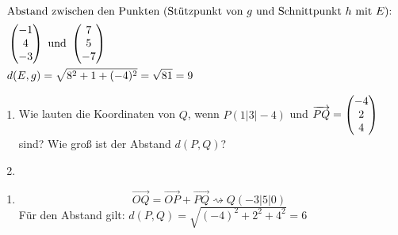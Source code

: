 \begin{lsg}{}
\begin{enumerate}
\begin{align*}
			\intertext{Abstand zwischen den Punkten (Stützpunkt von $g$ und Schnittpunkt $h$ mit $E$):}
			&\begin{pmatrix} -1 \\ 4 \\ -3 \end{pmatrix} \text{ und } \begin{pmatrix} 7\\5\\-7 \end{pmatrix} \\
			&d(E,g)=\sqrt{8^2+1+(-4)^2}=\sqrt{81}=9
		\end{align*}
	\end{enumerate}
\end{lsg}


\begin{enumerate}
	\item Wie lauten die Koordinaten von $Q$, wenn $P(1|3|-4)$ und $\overrightarrow{PQ}=\begin{pmatrix} -4\\2\\4 \end{pmatrix}$ sind?
	Wie groß ist der Abstand $d(P,Q)$?
	\item 
\end{enumerate}

\begin{lsg}{}
	\begin{enumerate}
		\item \begin{equation*}
			\overrightarrow{OQ}=\overrightarrow{OP}+\overrightarrow{PQ}\rightsquigarrow Q(-3|5|0)
	\end{equation*}
	Für den Abstand gilt: $d(P,Q)=\sqrt{(-4)^2+2^2+4^2}=6$
	\end{enumerate}
\end{lsg}



